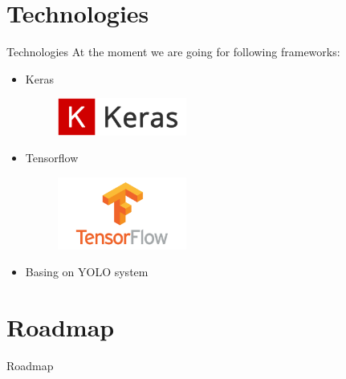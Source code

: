 \part{Technologies}
\begin{frame}[allowframebreaks]{Technologies}
  At the moment we are going for following frameworks:
  \begin{itemize}
  \item Keras
    \begin{figure}[H]
      \centering \includegraphics[width = 0.4\textwidth]{keras}
    \end{figure}
  \item Tensorflow
    \begin{figure}[H]
      \centering \includegraphics[width = 0.4\textwidth]{tensorflow}
    \end{figure}
  \item Basing on YOLO system
  \end{itemize}
\end{frame}
\part{Roadmap}
\begin{frame}{Roadmap}

\end{frame}


